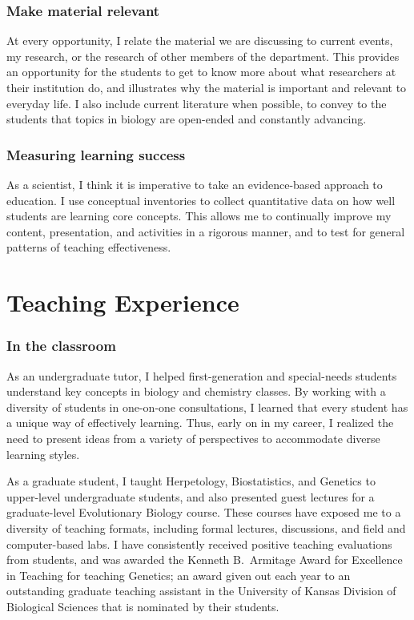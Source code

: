 \subsubsection*{Make material relevant}
At every opportunity, I relate the material we are discussing to current
events, my research, or the research of other members of the department.
This provides an opportunity for the students to get to know more about what
researchers at their institution do, and illustrates why the material is
important and relevant to everyday life.
I also include current literature when possible, to convey to the students that
topics in biology are open-ended and constantly advancing.

\subsubsection*{Measuring learning success}
As a scientist, I think it is imperative to take an evidence-based approach to
education.
I use conceptual inventories to collect quantitative data on how well students
are learning core concepts.
This allows me to continually improve my content, presentation, and activities
in a rigorous manner, and to test for general patterns of teaching
effectiveness.

\section*{Teaching Experience}
\subsubsection*{In the classroom}
As an undergraduate tutor, I helped first-generation and special-needs students
understand key concepts in biology and chemistry classes.
By working with a diversity of students in one-on-one consultations, I learned
that every student has a unique way of effectively learning.
Thus, early on in my career, I realized the need to present ideas from a
variety of perspectives to accommodate diverse learning styles.

As a graduate student, I taught Herpetology, Biostatistics, and Genetics
to upper-level undergraduate students, and also presented guest lectures for a
graduate-level Evolutionary Biology course.
These courses have exposed me to a diversity of teaching formats, including
formal lectures, discussions, and field and computer-based labs.
I have consistently received positive teaching evaluations from students, and
was awarded the Kenneth B.\ Armitage Award for Excellence in Teaching for
teaching Genetics; an award given out each year to an outstanding graduate
teaching assistant in the University of Kansas Division of Biological
Sciences that is nominated by their students.

